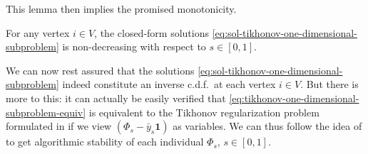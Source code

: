 \documentclass[letterpaper]{article} %
\begin{document}
This lemma then implies the promised monotonicity.  
\begin{proposition}\label{Propo:Non_Decreasing}
  For any vertex $i\in V$, the closed-form solutions \eqref{eq:sol-tikhonov-one-dimensional-subproblem} is non-decreasing with respect to $s\in \left[ 0,1 \right]$.
\end{proposition}

We can now rest assured that the solutions \eqref{eq:sol-tikhonov-one-dimensional-subproblem} indeed constitute an inverse c.d.f.\ at each vertex $i\in V$. But there is more to this: it can actually be easily verified that \eqref{eq:tikhonov-one-dimensional-subproblem-equiv} is equivalent to the Tikhonov regularization problem formulated in \cite{Belkin2004} if we view $\left(\Phi_s-\bar{y}_s\mathbf{1}\right)$ as variables. We can thus follow the idea of \cite[Theorem 5]{Belkin2004} to get algorithmic stability of each individual $\Phi_s$, $s\in \left[ 0,1 \right]$.
\end{document}
